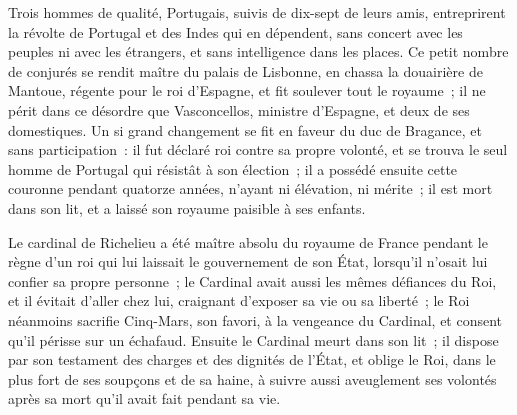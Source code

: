 \documentclass[french,twoside]{book} %
\begin{document}
Trois hommes de qualité, Portugais, suivis de dix-sept de leurs amis, entreprirent la révolte de Portugal et des Indes qui en dépendent, sans concert avec les peuples ni avec les étrangers, et sans intelligence dans les places. Ce petit nombre de conjurés se rendit maître du palais de Lisbonne, en chassa la douairière de Mantoue, régente pour le roi d’Espagne, et fit soulever tout le royaume ; il ne périt dans ce désordre que Vasconcellos, ministre d’Espagne, et deux de ses domestiques. Un si grand changement se fit en faveur du duc de Bragance, et sans participation : il fut déclaré roi contre sa propre volonté, et se trouva le seul homme de Portugal qui résistât à son élection ; il a possédé ensuite cette couronne pendant quatorze années, n’ayant ni élévation, ni mérite ; il est mort dans son lit, et a laissé son royaume paisible à ses enfants.\par
Le cardinal de Richelieu a été maître absolu du royaume de France pendant le règne d’un roi qui lui laissait le gouvernement de son État, lorsqu’il n’osait lui confier sa propre personne ; le Cardinal avait aussi les mêmes défiances du Roi, et il évitait d’aller chez lui, craignant d’exposer sa vie ou sa liberté ; le Roi néanmoins sacrifie Cinq-Mars, son favori, à la vengeance du Cardinal, et consent qu’il périsse sur un échafaud. Ensuite le Cardinal meurt dans son lit ; il dispose par son testament des charges et des dignités de l’État, et oblige le Roi, dans le plus fort de ses soupçons et de sa haine, à suivre aussi aveuglement ses volontés après sa mort qu’il avait fait pendant sa vie.\par
\end{document}
